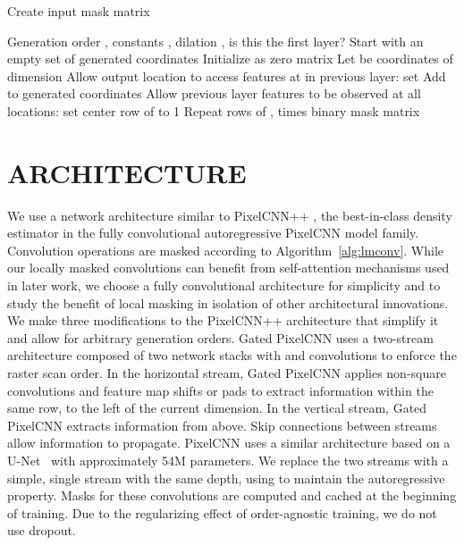 \documentclass[letterpaper]{article}
\begin{document}
\begin{algorithm}[t]
   \caption{Create input mask matrix}
   \label{alg:makemasks}
\begin{algorithmic}[1]
    Generation order , constants , dilation , is this the first layer?
   \STATE Start with an empty set of generated coordinates
   \STATE Initialize  as  zero matrix
   		\STATE Let  be coordinates of dimension 
	   			\STATE Allow output location  to access features at  in previous layer: set 
	   		\ENDIF
   		\ENDFOR{}
   		\STATE Add  to generated coordinates
   \ENDFOR{}
   		\STATE Allow previous layer features to be observed at all locations: set center row  of  to 1
   \ENDIF
   \STATE Repeat rows of ,  times
    binary mask matrix 
\end{algorithmic}
\end{algorithm}

\section{ARCHITECTURE}
\label{sec:architecture}

We use a network architecture similar to PixelCNN++ \citep{salimans2017pixelcnnpp}, the best-in-class density estimator in the fully convolutional autoregressive PixelCNN model family. Convolution operations are masked according to Algorithm~\ref{alg:lmconv}. While our locally masked convolutions can benefit from self-attention mechanisms used in later work, we choose a fully convolutional architecture for simplicity and to study the benefit of local masking in isolation of other architectural innovations. We make three modifications to the PixelCNN++ architecture that simplify it and allow for arbitrary generation orders.
Gated PixelCNN uses a two-stream architecture composed of two network stacks with  and  
convolutions to enforce the raster scan order. In the horizontal stream, Gated PixelCNN applies non-square convolutions and feature map shifts or pads to extract information within the same row, to the left of the current dimension. In the vertical stream, Gated PixelCNN extracts information from above. Skip connections between streams allow information to propagate.
PixelCNN uses a similar architecture based on a U-Net~\citep{ronneberger2015u} with approximately 54M parameters. We replace the two streams with a simple, single stream with the same depth, using \ours{} to maintain the autoregressive property. Masks for these convolutions are computed and cached at the beginning of training. Due to the regularizing effect of order-agnostic training, we do not use dropout.
\end{document}
